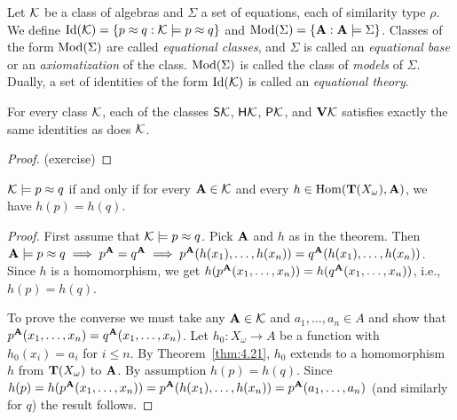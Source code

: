 \documentclass[12pt]{amsart}  %
\begin{document}
\begin{definition} Let $\mathcal{K}$ be a class of algebras and $\Sigma$ a set of equations, each 
of similarity type $\rho$. We define 
$\operatorname{Id}(\mathcal{K}) = \{p \approx q : \mathcal{K} \models p \approx q\}$ 
and
$\operatorname{Mod}(\Sigma) = \{ \mathbf{A} : \mathbf{A} \models \Sigma \}$.
Classes of the form $\operatorname{Mod}(\Sigma)$ are called \emph{equational classes}, and $\Sigma$ is called 
an \emph{equational base} or an \emph{axiomatization} of the class. $\operatorname{Mod}(\Sigma)$ is called the 
class of \emph{models} of $\Sigma$. Dually, a set of identities of the form $\operatorname{Id}(\mathcal{K})$ is called an 
\emph{equational theory}.
\end{definition}

\begin{lemma} 
  \label{lem:4.36} 
  For every class $\mathcal{K}$, each of the classes $\mathsf{S} \mathcal{K}$, 
  $\mathsf{H} \mathcal{K}$, $\mathsf{P} \mathcal{K}$, and $\mathbf{V} \mathcal{K}$ satisfies 
  exactly the same identities as does $\mathcal{K}$.
\end{lemma}
\begin{proof} (exercise) \end{proof}


\begin{lemma}
  \label{lem:4.37} 
  $\mathcal{K} \models p \approx q$ 
  if  and  only  if  for  every  $\mathbf{A} \in \mathcal{K}$  and  every  
  $h\in \operatorname{Hom}(\mathbf{T}(X_\omega),\mathbf{A})$,  we  have  $h(p)  =  h(q)$.
\end{lemma} 
\begin{proof} First  assume  that  $\mathcal{K} \models p\approx  q$.  
  Pick  $\mathbf{A}$ and $h$ as  in  the  theorem.  Then
  $\mathbf{A} \models p\approx q \implies p^{\mathbf{A}} = q^{\mathbf{A}} \implies 
  p^{\mathbf{A}}(h(x_1), \dots, h(x_n)) = q^{\mathbf{A}}(h(x_1), \dots, h(x_n))$.
  Since  $h$  is  a  homomorphism,  we  get  
  $h(p^{\mathbf{A}}(x_1, \dots, x_n)) = h(q^{\mathbf{A}}(x_1, \dots, x_n))$, i.e., $h(p) = h(q)$.

  To  prove  the  converse  we  must  take  any  $\mathbf{A} \in \mathcal{K}$  and  
  $a_1, \dots, a_n \in A$ and show that $p^{\mathbf{A}}(x_1, \dots, x_n) = q^{\mathbf{A}}(x_1, \dots, x_n)$.
  Let $h_0 \colon X_\omega \to A$ be a function with $h_0(x_i) = a_i$ for $i\leq n$.
  By  Theorem~\ref{thm:4.21},  $h_0$ extends  to  a homomorphism  $h$ from $\mathbf{T}(X_\omega)$
  to $\mathbf{A}$.  By  assumption  $h(p)  =  h(q)$.  Since 
  $h(p)  =  h(p^{\mathbf{A}}(x_1, \dots, x_n)) = 
  p^{\mathbf{A}}(h(x_1), \dots, h(x_n)) =  p^{\mathbf{A}}(a_1,\dots, a_n)$ 
  (and  similarly  for  $q$)  the  result  follows. 
\end{proof}
\end{document}
